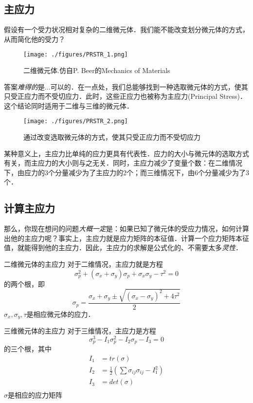 
\begin{issues}
\issueDraft
\end{issues}

\subsection{主应力}
假设有一个受力状况相对复杂的二维微元体．我们能不能改变划分微元体的方式，从而简化他的受力？
\begin{figure}[ht]
\centering
\texttt{[image: ./figures/PRSTR\_1.png]}
\caption{二维微元体.仿自P. Beer的Mechanics of Materials} \label{PRSTR_fig1}
\end{figure}

答案\textsl{难得的}是...可以的．在一点处，我们总能够找到一种选取微元体的方式，使其只受正应力而不受切应力．此时，这些正应力也被称为主应力(Principal Stress)．这个结论同时适用于二维与三维的微元体．
\begin{figure}[ht]
\centering
\texttt{[image: ./figures/PRSTR\_2.png]}
\caption{通过改变选取微元体的方式，使其只受正应力而不受切应力} \label{PRSTR_fig2}
\end{figure}

某种意义上，主应力比单纯的应力更具有代表性．应力的大小与微元体的选取方式有关，而主应力的大小则与之无关．同时，主应力减少了变量个数：在二维情况下，由应力的3个分量减少为了主应力的2个；而三维情况下，由6个分量减少为了3个．

\subsection{计算主应力}

那么，你现在想问的问题\textsl{大概一定}是：如果已知了微元体的受应力情况，如何计算出他的主应力呢？事实上，主应力就是应力矩阵的本征值．计算一个应力矩阵本征值，就能得到他的主应力．因此，主应力的求解是公式化的、不需要太多\textsl{灵性}．

\begin{example}{二维微元体的主应力}
对于二维情况，主应力就是方程
$$\sigma_p^2+(\sigma_x+\sigma_y)\sigma_p+\sigma_x\sigma_y-\tau^2=0$$
的两个根，即
$$\sigma_p=\frac{\sigma_x+\sigma_y \pm \sqrt{(\sigma_x-\sigma_y)^2+4\tau^2}}{2}$$
$\sigma_x,\sigma_y,\tau$是相应微元体的应力．
\end{example}

\begin{example}{三维微元体的主应力}
对于三维情况，主应力是方程 
$$
\sigma_p^3-I_1\sigma_p^2-I_2\sigma_p-I_3=0
$$
的三个根，其中
$$
\begin{aligned}
I_1&=tr(\sigma)\\
I_2&=\frac{1}{2} ({\sum \sigma_{ij} \sigma_{ij} -I_1^2})\\
I_3&=det(\sigma)\\
\end{aligned}
$$
$\sigma$是相应的应力矩阵
\end{example}
